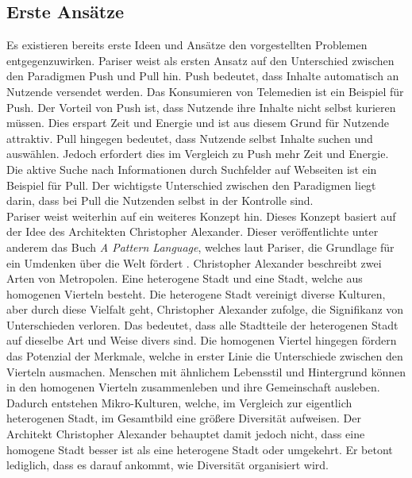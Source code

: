 \subsection{Erste Ansätze}
Es existieren bereits erste Ideen und Ansätze den vorgestellten Problemen entgegenzuwirken.
Pariser weist als ersten Ansatz auf den Unterschied zwischen den Paradigmen Push und Pull hin.
Push bedeutet, dass Inhalte automatisch an Nutzende versendet werden.
Das Konsumieren von Telemedien ist ein Beispiel für Push.
Der Vorteil von Push ist, dass Nutzende ihre Inhalte nicht selbst kurieren müssen.
Dies erspart Zeit und Energie und ist aus diesem Grund für Nutzende attraktiv.
Pull hingegen bedeutet, dass Nutzende selbst Inhalte suchen und auswählen.
Jedoch erfordert dies im Vergleich zu Push mehr Zeit und Energie.
Die aktive Suche nach Informationen durch Suchfelder auf Webseiten ist ein Beispiel für Pull.
Der wichtigste Unterschied zwischen den Paradigmen liegt darin, dass bei Pull die Nutzenden selbst in der Kontrolle sind.\\

Pariser weist weiterhin auf ein weiteres Konzept hin.
Dieses Konzept basiert auf der Idee des Architekten Christopher Alexander.
Dieser veröffentlichte unter anderem das Buch \textit{A Pattern Language}, welches laut Pariser, die Grundlage für ein Umdenken über die Welt fördert \cite{a-pattern-language}.
Christopher Alexander beschreibt zwei Arten von Metropolen.
Eine heterogene Stadt und eine Stadt, welche aus homogenen Vierteln besteht.
Die heterogene Stadt vereinigt diverse Kulturen, aber durch diese Vielfalt geht, Christopher Alexander zufolge, die Signifikanz von Unterschieden verloren.
Das bedeutet, dass alle Stadtteile der heterogenen Stadt auf dieselbe Art und Weise divers sind.
Die homogenen Viertel hingegen fördern das Potenzial der Merkmale, welche in erster Linie die Unterschiede zwischen den Vierteln ausmachen.
Menschen mit ähnlichem Lebensstil und Hintergrund können in den homogenen Vierteln zusammenleben und ihre Gemeinschaft ausleben.
Dadurch entstehen Mikro-Kulturen, welche, im Vergleich zur eigentlich heterogenen Stadt, im Gesamtbild eine größere Diversität aufweisen.
Der Architekt Christopher Alexander behauptet damit jedoch nicht, dass eine homogene Stadt besser ist als eine heterogene Stadt oder umgekehrt.
Er betont lediglich, dass es darauf ankommt, wie Diversität organisiert wird.\\

